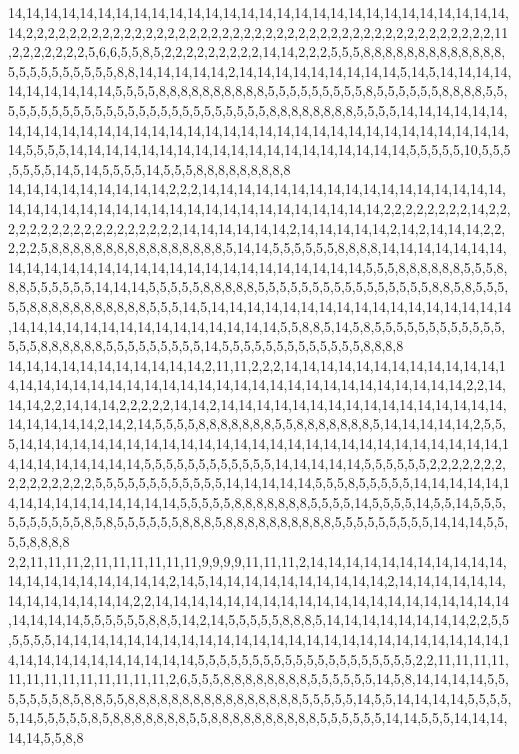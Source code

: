 14,14,14,14,14,14,14,14,14,14,14,14,14,14,14,14,14,14,14,14,14,14,14,14,14,14,14,14,14,2,2,2,2,2,2,2,2,2,2,2,2,2,2,2,2,2,2,2,2,2,2,2,2,2,2,2,2,2,2,2,2,2,2,2,2,2,2,2,2,2,2,2,11,2,2,2,2,2,2,2,5,6,6,5,5,8,5,2,2,2,2,2,2,2,2,2,14,14,2,2,2,5,5,5,8,8,8,8,8,8,8,8,8,8,8,8,8,5,5,5,5,5,5,5,5,5,5,8,8,14,14,14,14,14,2,14,14,14,14,14,14,14,14,14,5,14,5,14,14,14,14,14,14,14,14,14,14,5,5,5,5,8,8,8,8,8,8,8,8,8,8,5,5,5,5,5,5,5,5,5,8,5,5,5,5,5,5,8,8,8,8,5,5,5,5,5,5,5,5,5,5,5,5,5,5,5,5,5,5,5,5,5,5,5,5,5,5,8,8,8,8,8,8,8,8,5,5,5,5,14,14,14,14,14,14,14,14,14,14,14,14,14,14,14,14,14,14,14,14,14,14,14,14,14,14,14,14,14,14,14,14,14,14,14,5,5,5,5,14,14,14,14,14,14,14,14,14,14,14,14,14,14,14,14,14,14,14,5,5,5,5,5,10,5,5,5,5,5,5,5,14,5,14,5,5,5,5,14,5,5,5,8,8,8,8,8,8,8,8,8
14,14,14,14,14,14,14,14,14,2,2,2,14,14,14,14,14,14,14,14,14,14,14,14,14,14,14,14,14,14,14,14,14,14,14,14,14,14,14,14,14,14,14,14,14,14,14,14,14,14,2,2,2,2,2,2,2,2,14,2,2,2,2,2,2,2,2,2,2,2,2,2,2,2,2,2,2,14,14,14,14,14,14,2,14,14,14,14,14,2,14,2,14,14,14,2,2,2,2,2,5,8,8,8,8,8,8,8,8,8,8,8,8,8,8,8,8,5,14,14,5,5,5,5,5,5,8,8,8,8,14,14,14,14,14,14,14,14,14,14,14,14,14,14,14,14,14,14,14,14,14,14,14,14,14,14,14,5,5,5,8,8,8,8,8,8,5,5,5,8,8,8,5,5,5,5,5,5,14,14,14,5,5,5,5,5,8,8,8,8,8,5,5,5,5,5,5,5,5,5,5,5,5,5,5,5,5,8,8,5,8,5,5,5,5,5,8,8,8,8,8,8,8,8,8,8,8,5,5,5,14,5,14,14,14,14,14,14,14,14,14,14,14,14,14,14,14,14,14,14,14,14,14,14,14,14,14,14,14,14,14,14,14,14,5,5,8,8,5,14,5,8,5,5,5,5,5,5,5,5,5,5,5,5,5,5,5,8,8,8,8,8,8,5,5,5,5,5,5,5,5,5,14,5,5,5,5,5,5,5,5,5,5,5,5,5,8,8,8,8
14,14,14,14,14,14,14,14,14,14,14,2,11,11,2,2,2,14,14,14,14,14,14,14,14,14,14,14,14,14,14,14,14,14,14,14,14,14,14,14,14,14,14,14,14,14,14,14,14,14,14,14,14,14,14,2,2,14,14,14,2,2,14,14,14,2,2,2,2,2,14,14,2,14,14,14,14,14,14,14,14,14,14,14,14,14,14,14,14,14,14,14,14,14,2,14,2,14,5,5,5,5,8,8,8,8,8,8,8,5,5,8,8,8,8,8,8,8,5,14,14,14,14,14,2,5,5,5,14,14,14,14,14,14,14,14,14,14,14,14,14,14,14,14,14,14,14,14,14,14,14,14,14,14,14,14,14,14,14,14,14,14,14,5,5,5,5,5,5,5,5,5,5,5,5,14,14,14,14,14,5,5,5,5,5,5,2,2,2,2,2,2,2,2,2,2,2,2,2,2,2,5,5,5,5,5,5,5,5,5,5,5,5,14,14,14,14,14,5,5,5,8,5,5,5,5,5,14,14,14,14,14,14,14,14,14,14,14,14,14,14,14,5,5,5,5,5,8,8,8,8,8,8,8,5,5,5,5,14,5,5,5,5,14,5,5,14,5,5,5,5,5,5,5,5,5,5,8,5,8,5,5,5,5,5,5,8,8,8,5,8,8,8,8,8,8,8,8,8,8,5,5,5,5,5,5,5,5,5,14,14,14,5,5,5,5,8,8,8,8
2,2,11,11,11,2,11,11,11,11,11,11,9,9,9,9,11,11,11,2,14,14,14,14,14,14,14,14,14,14,14,14,14,14,14,14,14,14,14,14,2,14,5,14,14,14,14,14,14,14,14,14,14,2,14,14,14,14,14,14,14,14,14,14,14,14,14,2,2,14,14,14,14,14,14,14,14,14,14,14,14,14,14,14,14,14,14,14,14,14,14,14,14,5,5,5,5,5,5,8,8,5,14,2,14,5,5,5,5,5,8,8,8,5,14,14,14,14,14,14,14,14,2,2,5,5,5,5,5,5,14,14,14,14,14,14,14,14,14,14,14,14,14,14,14,14,14,14,14,14,14,14,14,14,14,14,14,14,14,14,14,14,14,14,14,14,5,5,5,5,5,5,5,5,5,5,5,5,5,5,5,5,5,5,5,5,2,2,11,11,11,11,11,11,11,11,11,11,11,11,11,2,6,5,5,5,8,8,8,8,8,8,8,8,5,5,5,5,5,5,14,5,8,14,14,14,14,5,5,5,5,5,5,5,8,5,8,8,5,5,8,8,8,8,8,8,8,8,8,8,8,8,8,8,8,8,5,5,5,5,5,14,5,5,14,14,14,14,5,5,5,5,5,14,5,5,5,5,5,8,5,8,8,8,8,8,8,8,5,5,8,8,8,8,8,8,8,8,8,8,5,5,5,5,5,5,14,14,5,5,5,14,14,14,14,14,5,5,8,8
